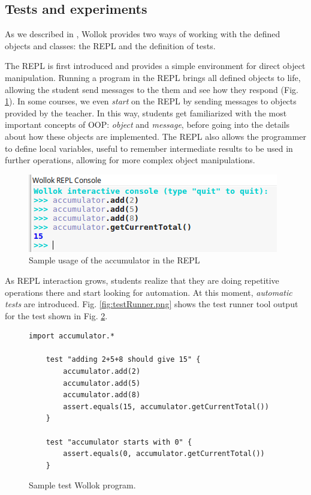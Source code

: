 \subsection{Tests and experiments}
\label{sec:testing}
As we described in , Wollok provides two ways of working with the defined objects and classes: the REPL and the definition of tests.

The REPL is first introduced and provides a simple environment for direct object manipulation.
Running a program in the REPL brings all defined objects to life,
allowing the student send messages to the them and see how they respond (\cf Fig. \ref{fig:repl}).
In some courses, we even \emph{start} on the REPL by sending messages to objects provided by the teacher.
In this way, students get familiarized with the most important concepts of OOP: \emph{object} and \emph{message}, 
before going into the details about how these objects are implemented.
The REPL also allows the programmer to define local variables, 
useful to remember intermediate results to be used in further operations, 
allowing for more complex object manipulations.

\begin{figure}[ht]
\vspace{-2mm}
 \centering
 \includegraphics[scale=0.55]{images/accumulator-repl.png}
\vspace{-3mm}
\caption{Sample usage of the accumulator in the REPL}
\label{fig:repl}
\vspace{-4mm}
\end{figure}

As REPL interaction grows, students realize that they are doing repetitive operations there 
and start looking for automation.
At this moment, \emph{automatic tests} are introduced.
Fig. \ref{fig:testRunner.png} shows the test runner tool output for the test shown in Fig. \ref{fig:test}.

\begin{figure}[ht]
\vspace{-3mm}
\centering
\begin{lstlisting}[language=Wollok]
 	import accumulator.*

	test "adding 2+5+8 should give 15" {
		accumulator.add(2)
		accumulator.add(5)
		accumulator.add(8)
		assert.equals(15, accumulator.getCurrentTotal())		
	}
   
	test "accumulator starts with 0" {
		assert.equals(0, accumulator.getCurrentTotal())
	}\end{lstlisting}
\vspace{-5mm}
\caption{Sample test Wollok program.}
\label{fig:test}
\end{figure}

